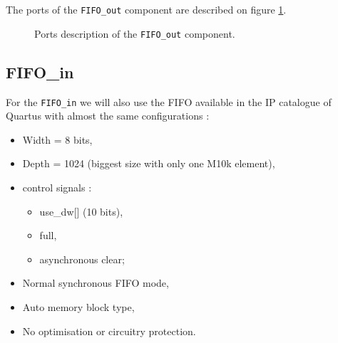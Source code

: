 \documentclass[11pt]{article}
\begin{document}
The ports of the \texttt{FIFO\_out} component are described on figure \ref{fifo_out_ports}.
\begin{figure}[H]
        \caption{Ports description of the \texttt{FIFO\_out} component.}
        \label{fifo_out_ports}
\end{figure}
\pagebreak
\subsection{FIFO\_in}
For the \texttt{FIFO\_in} we will also use the FIFO available in the IP catalogue of Quartus with almost the same configurations :
\begin{itemize}
    \item Width = 8 bits,
    \item Depth = 1024 (biggest size with only one M10k element),
    \item control signals : \begin{itemize}
        \item use\_dw[] (10 bits),
        \item full,
        \item asynchronous clear; \end{itemize}
    \item Normal synchronous FIFO mode,
    \item Auto memory block type,
    \item No optimisation or circuitry protection.
\end{itemize}
\end{document}

